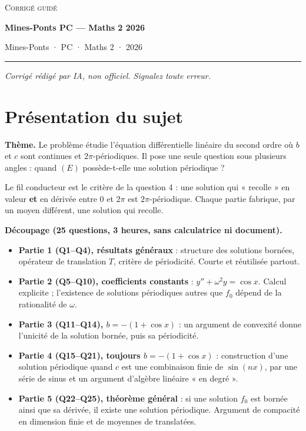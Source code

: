 \documentclass[11pt,a4paper]{article}
\providecommand{\tightlist}{\setlength{\itemsep}{0pt}\setlength{\parskip}{0pt}}
\newcommand{\equationajustee}[1]{%
  \sbox{\boiteequation}{$\displaystyle #1$}%
  \ifdim\wd\boiteequation>\linewidth
    \[\resizebox{\linewidth}{!}{\usebox{\boiteequation}}\]%
  \else
    \[#1\]%
  \fi}
\begin{document}
\thispagestyle{plain}
\begin{center}
  {\small\scshape Corrigé guidé}\par\smallskip
  {\LARGE\bfseries Mines-Ponts PC — Maths 2 2026\par}\medskip
  {\large Mines-Ponts · PC · Maths 2 · 2026\par}
\end{center}
\vspace{2pt}\hrule\vspace{8pt}

\emph{Corrigé rédigé par IA, non officiel. Signalez toute erreur.}

\hypertarget{pruxe9sentation-du-sujet}{%
\section{Présentation du sujet}\label{pruxe9sentation-du-sujet}}

\textbf{Thème.} Le problème étudie l'équation différentielle linéaire du second ordre
\equationajustee{(E)\quad y''+b(x)y=c(x),}
où \(b\) et \(c\) sont continues et \(2\pi\)-périodiques. Il pose une seule question sous plusieurs angles : quand \((E)\) possède-t-elle une solution périodique ?

Le fil conducteur est le critère de la question 4 : une solution qui « recolle » en valeur \textbf{et} en dérivée entre \(0\) et \(2\pi\) est \(2\pi\)-périodique. Chaque partie fabrique, par un moyen différent, une solution qui recolle.

\textbf{Découpage (25 questions, 3 heures, sans calculatrice ni document).}

\begin{itemize}
\tightlist
\item
  \textbf{Partie 1 (Q1--Q4), résultats généraux} : structure des solutions bornées, opérateur de translation \(T\), critère de périodicité. Courte et réutilisée partout.
\item
  \textbf{Partie 2 (Q5--Q10), coefficients constants} : \(y''+\omega^2y=\cos x\). Calcul explicite ; l'existence de solutions périodiques autres que \(f_0\) dépend de la rationalité de \(\omega\).
\item
  \textbf{Partie 3 (Q11--Q14), \(b=-(1+\cos x)\)} : un argument de convexité donne l'unicité de la solution bornée, puis sa périodicité.
\item
  \textbf{Partie 4 (Q15--Q21), toujours \(b=-(1+\cos x)\)} : construction d'une solution périodique quand \(c\) est une combinaison finie de \(\sin(nx)\), par une série de sinus et un argument d'algèbre linéaire « en degré ».
\item
  \textbf{Partie 5 (Q22--Q25), théorème général} : si une solution \(f_0\) est bornée ainsi que sa dérivée, il existe une solution périodique. Argument de compacité en dimension finie et de moyennes de translatées.
\end{itemize}
\end{document}
